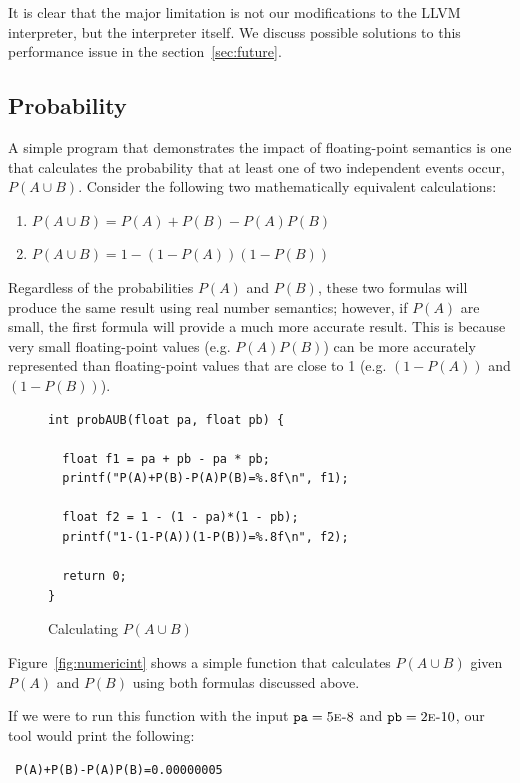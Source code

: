 It is clear that the major limitation is not our modifications to the LLVM interpreter, but the interpreter itself. We discuss possible solutions to this performance issue in the section~\ref{sec:future}.

\subsection{Probability}

A simple program that demonstrates the impact of floating-point semantics is one that calculates the probability that at least one of two independent events occur, $P(A \cup B)$. Consider the following two mathematically equivalent calculations:

\begin{enumerate}
\item $P(A \cup B) = P(A) + P(B) - P(A)P(B)$
\item $P(A \cup B) = 1 - (1 - P(A))(1 - P(B))$
\end{enumerate}

Regardless of the probabilities $P(A)$ and $P(B)$, these two formulas will produce the same result using real number semantics; however, if $P(A)$ are small, the first formula will provide a much more accurate result. This is because very small floating-point values (e.g. $P(A)P(B)$) can be more accurately represented than floating-point values that are close to 1 (e.g. $(1 - P(A))$ and $(1 - P(B))$).

\begin{figure}[t!]
\begin{lstlisting}
int probAUB(float pa, float pb) {
  
  float f1 = pa + pb - pa * pb;
  printf("P(A)+P(B)-P(A)P(B)=%.8f\n", f1);
  
  float f2 = 1 - (1 - pa)*(1 - pb);
  printf("1-(1-P(A))(1-P(B))=%.8f\n", f2);
  
  return 0;
}
\end{lstlisting}
\caption{Calculating $P(A \cup B)$}
\label{fig:prob}
\end{figure}

Figure~\ref{fig:numericint} shows a simple function that calculates $P(A \cup B)$ given $P(A)$ and $P(B)$ using both formulas discussed above.

If we were to run this function with the input $\texttt{pa} = 5\text{\sc{e}-}8$ and $\texttt{pb} = 2\text{\sc{e}-}10$, our tool would print the following:

{\tt\footnotesize
P(A)+P(B)-P(A)P(B)=0.00000005}

